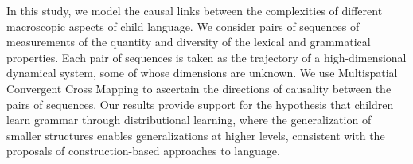 In this study, we model the causal links between the complexities of different macroscopic aspects of child language. We consider pairs of sequences of measurements of the quantity and diversity of the lexical and grammatical properties. Each pair of sequences is taken as the trajectory of a high-dimensional dynamical system, some of whose dimensions are unknown. We use Multispatial Convergent Cross Mapping to ascertain the directions of causality between the pairs of sequences. Our results provide support for the hypothesis that  children learn grammar through distributional learning, where the generalization of smaller structures enables generalizations at higher levels, consistent with the proposals of construction-based approaches to language.
